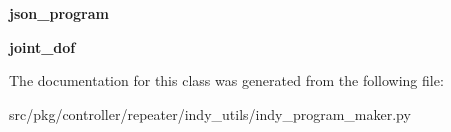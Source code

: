 \begin{DoxyCompactItemize}
{\bfseries json\+\_\+program}
\item 
\mbox{\label{classrnb-planning_1_1src_1_1pkg_1_1controller_1_1repeater_1_1indy__utils_1_1indy__program__maker_1_1_json_program_component_a3aeb6a6b7adac0e10bf95bcf10263f1c}} 
{\bfseries joint\+\_\+dof}
\end{DoxyCompactItemize}


The documentation for this class was generated from the following file\+:\begin{DoxyCompactItemize}
\item 
src/pkg/controller/repeater/indy\+\_\+utils/indy\+\_\+program\+\_\+maker.\+py\end{DoxyCompactItemize}
